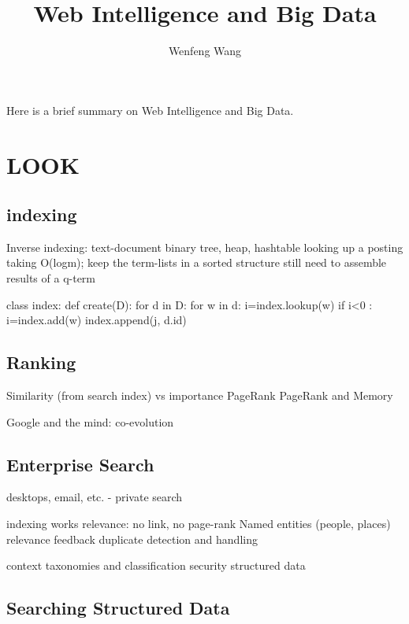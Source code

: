 \documentclass[11pt, oneside]{article}   	%
\title{Web Intelligence and Big Data}
\author{Wenfeng Wang}
\begin{document}
\maketitle



Here is a brief summary on Web Intelligence and Big Data. 

\section{LOOK}
  \subsection{indexing}
	Inverse indexing:  text-document
	binary tree, heap,  hashtable
	looking up a posting taking O(logm);
	  keep the term-lists in a sorted structure
	  still need to assemble results of a q-term

	class index:
	  def create(D):
		 for d in D:
			for w in d:
				i=index.lookup(w)
				if i<0 :
					i=index.add(w)
				index.append(j, d.id)
				
\subsection{Ranking}
	Similarity (from search index) vs importance
PageRank
PageRank and Memory

Google and the mind: co-evolution

\subsection{Enterprise Search}
  desktops, email, etc. - private search

	indexing works
	relevance: no link,  no page-rank
	Named entities (people, places)
	relevance feedback
	duplicate detection and handling

	context 
	taxonomies and classification
	security
	structured data

\subsection{Searching Structured Data}
\end{document}
